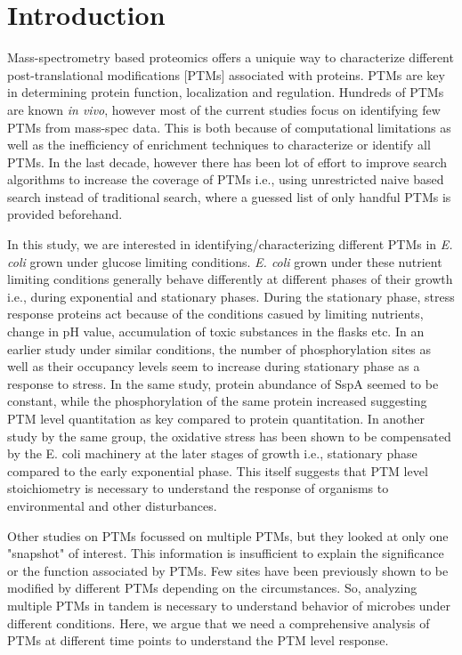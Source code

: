 \documentclass[12pt]{article}
\begin{document}

\section{Introduction}

Mass-spectrometry based proteomics offers a uniquie way to characterize different post-translational modifications [PTMs] associated with proteins. PTMs are key in determining protein function, localization and regulation. Hundreds of PTMs are known \emph{in vivo}, however most of the current studies focus on identifying few PTMs from mass-spec data. This is both because of computational limitations as well as the inefficiency of enrichment techniques to characterize or identify all PTMs. In the last decade, however there has been lot of effort to improve search algorithms to increase the coverage of PTMs i.e., using unrestricted naive based search instead of traditional search, where a guessed list of only handful PTMs is provided beforehand.

In this study, we are interested in identifying/characterizing different PTMs in \emph{E. coli} grown under glucose limiting conditions. \emph{E. coli} grown under these nutrient limiting conditions generally behave differently at different phases of their growth i.e., during exponential and stationary phases. During the stationary phase, stress response proteins act because of the conditions casued by limiting nutrients, change in pH value, accumulation of toxic substances in the flasks etc. In an earlier study under similar conditions, the number of phosphorylation sites as well as their occupancy levels seem to increase during stationary phase as a response to stress. In the same study, protein abundance of SspA seemed to be constant, while the phosphorylation of the same protein increased suggesting PTM level quantitation as key compared to protein quantitation. In another study by the same group, the oxidative stress has been shown to be compensated by the E. coli machinery at the later stages of growth i.e., stationary phase compared to the early exponential phase. This itself suggests that PTM level stoichiometry is necessary to understand the response of organisms to environmental and other disturbances.

Other studies on PTMs focussed on multiple PTMs, but they looked at only one "snapshot" of interest. This information is insufficient to explain the significance or the function associated by PTMs. Few sites have been previously shown to be modified by different PTMs depending on the circumstances. So, analyzing multiple PTMs in tandem is necessary to understand behavior of microbes under different conditions. Here, we argue that we need a comprehensive analysis of PTMs at different time points to understand the PTM level response. 
\end{document}
